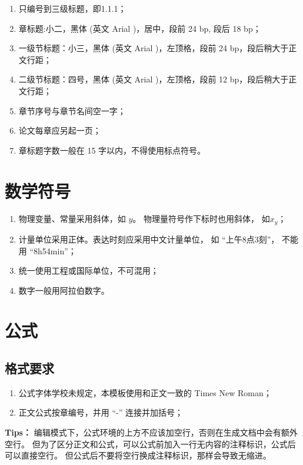 \begin{enumerate}
	\item 只编号到三级标题，即1.1.1；
	\item	章标题:小二，黑体 (英文 Arial )，居中，段前 24 bp, 段后 18 bp；
	\item 一级节标题：小三，黑体 (英文 Arial )，左顶格，段前 24 bp，段后稍大于正文行距；
	\item 二级节标题：四号，黑体 (英文 Arial )，左顶格，段前 12 bp，段后稍大于正文行距；
	\item 章节序号与章节名间空一字；
	\item 论文每章应另起一页；
	\item 章标题字数一般在 15 字以内，不得使用标点符号。
\end{enumerate}

\section{数学符号}

\begin{enumerate}
	\item 物理变量、常量采用斜体，如 $y$。 物理量符号作下标时也用斜体， 如$x_y$；
	\item 计量单位采用正体。表达时刻应采用中文计量单位，
				如 ``上午8点3刻''， 不能用 ``8h54min''；
	\item 统一使用工程或国际单位，不可混用；
	\item 数字一般用阿拉伯数字。
\end{enumerate}

\section{公式}

\subsection{格式要求}

\begin{enumerate}
	\item 公式字体学校未规定，本模板使用和正文一致的 Times New Roman；
	\item 正文公式按章编号，并用 ``-'' 连接并加括号；
\end{enumerate}

\textbf{Tips：} 编辑模式下，公式环境的上方不应该加空行，否则在生成文档中会有额外空行。
但为了区分正文和公式，可以公式前加入一行无内容的注释标识，公式后可以直接空行。
但公式后不要将空行换成注释标识，那样会导致无缩进。

